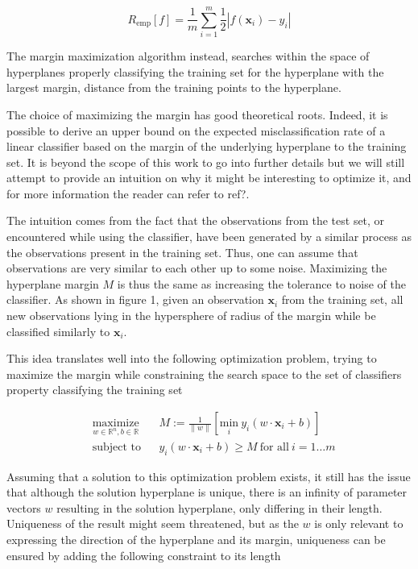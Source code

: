 \begin{equation}
  R_{\text{emp}}[f] = \frac{1}{m}\sum^m_{i=1}\frac{1}{2}|f(\mathbf{x}_i) - y_i|
\end{equation}

The margin maximization algorithm instead, searches within the space of hyperplanes properly classifying the training set for the hyperplane with the largest margin, distance from the training points to the hyperplane.

The choice of maximizing the margin has good theoretical roots. Indeed, it is possible to derive an upper bound on the expected misclassification rate of a linear classifier based on the margin of the underlying hyperplane to the training set. It is beyond the scope of this work to go into further details but we will still attempt to provide an intuition on why it might be interesting to optimize it, and for more information the reader can refer to \textcolor[rgb]{1,0,0}{ref?}.

The intuition comes from the fact that the observations from the test set, or encountered while using the classifier, have been generated by a similar process as the observations present in the training set. Thus, one can assume that observations are very similar to each other up to some noise. Maximizing the hyperplane margin
$M$ is thus the same as increasing the tolerance to noise of the classifier. As shown in figure 1, given an observation $\mathbf{x}_i$ from the training set, all new observations lying in the hypersphere of radius of the margin while be classified similarly to $\mathbf{x}_i$.

This idea translates well into the following optimization problem, trying to maximize the margin while constraining the search space to the set of classifiers property classifying the training set

\begin{equation}
  \begin{aligned}
    &\underset{w \in \mathbb{R}^n, b \in \mathbb{R}} {\text{maximize}}
    & & M := \frac{1}{\|w\|} \left[\underset{i} {\text{min}}\ 
    y_i(w \cdot \mathbf{x}_i + b)\right]\\
    &\text{subject to}
    & &y_i(w \cdot \mathbf{x}_i + b) \ge M\ \text{for all}\ i = 1 \dotsc m
  \end{aligned}
\end{equation}

Assuming that a solution to this optimization problem exists, it still has the issue that although the solution hyperplane is unique, there is an infinity of parameter vectors $w$ resulting in the solution hyperplane, only differing in their length. Uniqueness of the result might seem threatened, but as the $w$ is only relevant to expressing the direction of the hyperplane and its margin, uniqueness can be ensured by adding the following constraint to its length


